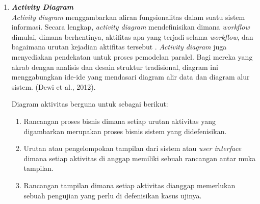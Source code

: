 \begin{enumerate}
        \item  \textbf{\textit{Activity Diagram}}\\ \textit{Activity diagram} menggambarkan aliran fungsionalitas dalam suatu sistem informasi. Secara lengkap, \textit{activity diagram} mendefinisikan dimana \textit{workflow} dimulai, dimana berhentinya, aktifitas apa yang terjadi selama \textit{workflow}, dan bagaimana urutan kejadian aktifitas tersebut \citep{dicoding2021activity}. \textit{Activity diagram} juga menyediakan pendekatan untuk proses pemodelan paralel. Bagi mereka yang akrab dengan analisis dan desain struktur tradisional, diagram ini menggabungkan ide-ide yang mendasari diagram alir data dan diagram alur sistem. (Dewi et al., 2012). 

		\par Diagram aktivitas berguna untuk sebagai berikut:
			
			\begin{enumerate} [label=\alph*.]
			\item Rancangan proses bisnis dimana setiap urutan aktivitas yang digambarkan merupakan proses bisnis sistem yang didefenisikan.
			\item Urutan atau pengelompokan tampilan dari sistem atau \textit{user interface} dimana setiap aktivitas di anggap memiliki sebuah rancangan antar muka tampilan.
			\item Rancangan tampilan dimana setiap aktivitas dianggap memerlukan sebuah pengujian yang perlu di defenisikan kasus ujinya.
			\end{enumerate}
        

\end{enumerate}

